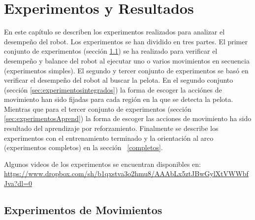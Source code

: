 \chapter{Experimentos y Resultados}\label{chapter:resultados}
En este capítulo se describen los experimentos realizados para analizar el desempeño del robot. Los experimentos se han dividido en tres partes. El primer conjunto de experimentos (sección \ref{sec:experimentosMov}) se ha realizado para verificar el desempeño y balance del robot al ejecutar uno o varios movimientos en secuencia (experimentos simples). El segundo y tercer conjunto de experimentos se bas\'o en verificar el desempeño del robot al buscar la pelota. En el segundo conjunto (sección \ref{sec:experimentosintegrados}) la forma de escoger la acciónes de movimiento han sido fijadas para cada región en la que se detecta la pelota. Mientras que para el tercer conjunto de experimentos (secci\'on \ref{sec:experimentosAprend}) la forma de escoger las acciones de movimiento ha sido resultado del aprendizaje por reforzamiento. Finalmente se describe los experimentos con el entrenamiento terminado y la orientaci\'on al arco (experimentos completos) en la secci\'on ~\ref{completos}. 

Algunos videos de los experimentos se encuentran disponibles en: \url { https://www.dropbox.com/sh/b1qxstva3o2hmu8/AAAbLx5ztJBwGylXtVWWbfJva?dl=0}
\section{Experimentos de Movimientos}\label{sec:experimentosMov}

